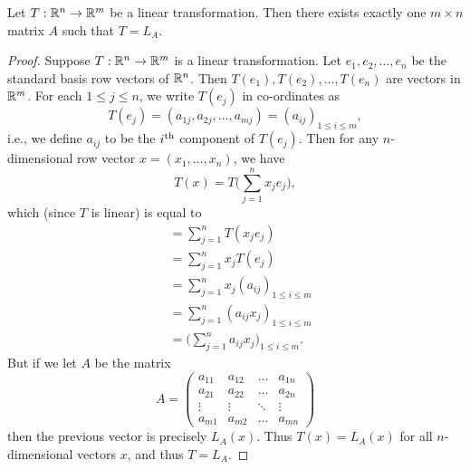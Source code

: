 \setcounter{thm}{12}
\begin{lem}\label{ii:6.1.13}
  Let \(T : \mathbb{R}^n \to \mathbb{R}^m\) be a linear transformation.
  Then there exists exactly one \(m \times n\) matrix \(A\) such that \(T = L_A\).
\end{lem}

\begin{proof}
  Suppose \(T : \mathbb{R}^n \to \mathbb{R}^m\) is a linear transformation.
  Let \(e_1, e_2, \dots, e_n\) be the standard basis row vectors of \(\mathbb{R}^n\).
  Then \(T(e_1), T(e_2), \dots, T(e_n)\) are vectors in \(\mathbb{R}^m\).
  For each \(1 \leq j \leq n\), we write \(T(e_j)\) in co-ordinates as
  \[
    T(e_j) = (a_{1j}, a_{2j}, \dots, a_{mj}) = (a_{ij})_{1 \leq i \leq m},
  \]
  i.e., we define \(a_{ij}\) to be the \(i^{\operatorname{th}}\) component of \(T(e_j)\).
  Then for any \(n\)- dimensional row vector \(x = (x_1, \dots, x_n)\), we have
  \[
    T(x) = T\bigg(\sum_{j = 1}^n x_j e_j\bigg),
  \]
  which (since \(T\) is linear) is equal to
  \begin{align*}
     & = \sum_{j = 1}^n T(x_j e_j)                                \\
     & = \sum_{j = 1}^n x_j T(e_j)                                \\
     & = \sum_{j = 1}^n x_j (a_{ij})_{1 \leq i \leq m}            \\
     & = \sum_{j = 1}^n (a_{ij} x_j)_{1 \leq i \leq m}            \\
     & = \bigg(\sum_{j = 1}^n a_{ij} x_j\bigg)_{1 \leq i \leq m}.
  \end{align*}
  But if we let \(A\) be the matrix
  \[
    A = \begin{pmatrix}
      a_{11} & a_{12} & \dots  & a_{1n} \\
      a_{21} & a_{22} & \dots  & a_{2n} \\
      \vdots & \vdots & \ddots & \vdots \\
      a_{m1} & a_{m2} & \dots  & a_{mn}
    \end{pmatrix}
  \]
  then the previous vector is precisely \(L_A(x)\).
  Thus \(T(x) = L_A(x)\) for all \(n\)-dimensional vectors \(x\), and thus \(T = L_A\).


\end{proof}
